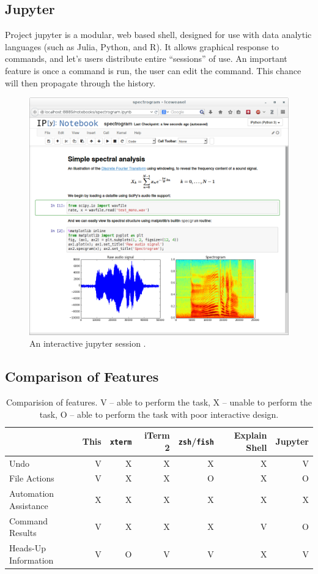 \subsection{Jupyter}
Project jupyter is a modular, web based shell, designed for use with data
analytic languages (such as Julia, Python, and R). It allows graphical response
to commands, and let’s users distribute entire “sessions” of use. An important
feature is once a command is run, the user can edit the command. This chance
will then propagate through the history.

\begin{figure}[H]
  \centering
  \includegraphics[width=0.8\linewidth]{figures/existing/ipython.png}
  \caption{An interactive jupyter session \cite{jupyter}.}
  \label{fig:jupyter}
\end{figure}

\subsection{Comparison of Features}

\begin{table}[H]
  \centering
  \begin{tabular}{|l|r|r|r|r|r|r|}
    \hline
    & This & \texttt{xterm} & iTerm 2 & \texttt{zsh}/\texttt{fish}
    & Explain Shell & Jupyter \\\hline
    Undo & V & X & X & X & X & V \\\hline
    File Actions & V & X & X & O & X & O\\\hline
    Automation Assistance & X & X & X & X & X & X\\\hline
    Command Results & V & X & X & X & V & O\\\hline
    Heads-Up Information & V & O & V & V & X & V\\\hline
  \end{tabular}
  \caption{Comparision of features. V -- able to perform the task, X -- unable
    to perform the task, O -- able to perform the task with poor interactive
    design.}
  \label{tab:features}
\end{table}

